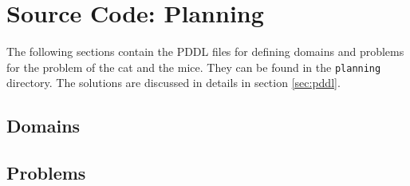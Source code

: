 \chapter{Source Code: Planning} 


The following sections contain the PDDL files for defining domains and problems for the problem of the cat and the mice. They can be found in the \verb|planning| directory. The solutions are discussed in details in section \ref{sec:pddl}. 

\section{Domains}


\section{Problems}

